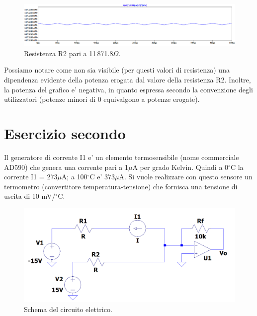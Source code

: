 \documentclass[a4paper,10pt]{article}
\begin{document}
\begin{figure}[h!]
	\centering
 	\includegraphics[width=1\linewidth]{plot1-6-mod.png}
  	\caption{Resistenza R2 pari a 11\,871.8$\Omega$.}
  	\label{fig:pow2}
\end{figure}

Possiamo notare come non sia visibile (per questi valori di resistenza) una dipendenza evidente della potenza erogata dal valore della resistenza R2. Inoltre, la potenza del grafico e' negativa, in quanto espressa secondo la convenzione degli utilizzatori (potenze minori di 0 equivalgono a potenze erogate).

\pagebreak

\section{Esercizio secondo}
Il generatore di corrente I1 e' un elemento termosensibile (nome commerciale AD590) che genera una corrente pari a 1$\mu$A per grado Kelvin. Quindi a 0$^{\circ}$C la corrente I1 = 273$\mu$A; a 100$^{\circ}$C e' 373$\mu$A.
Si vuole realizzare con questo sensore un termometro (convertitore temperatura-tensione) che fornisca una tensione di uscita di 10 mV/$^{\circ}$C.
\begin{figure}[h!]
	\centering
 	\includegraphics[width=0.7\linewidth]{ckt2.png}
  	\caption{Schema del circuito elettrico.}
  	\label{fig:ckt2}
\end{figure}
\end{document}
